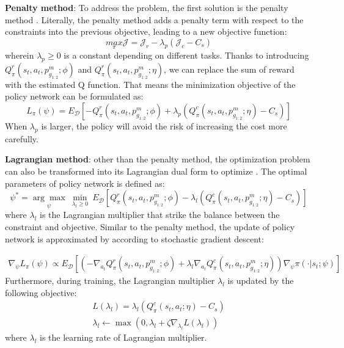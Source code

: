 \documentclass{article}
\begin{document}
\textbf{Penalty method}: To address the problem, the first solution is the penalty method \cite{geibel2005risk}. Literally, the penalty method adds a penalty term with respect to the constraints into the previous objective, leading to a new objective function:
\begin{equation}
  \label{eq11}
\underset{\pi}{max} \mathcal J =\mathcal J_r - \lambda_p (\mathcal J_c - C_s)
\end{equation}
wherein $\lambda_p \geq 0$ is a constant depending on different tasks. Thanks to introducing $Q^r_\pi(s_t,a_t,p^m_{g_{1:2}};\phi)$ and $Q^r_\pi(s_t,a_t,p^m_{g_{1:2}};\eta)$, we can replace the sum of reward with the estimated Q function. That means the minimization objective of the policy network can be formulated as:
\begin{equation}
  \label{eq12}
L_\pi(\psi) = E_{\mathcal D}[-Q^r_\pi(s_t,a_t,p^m_{g_{1:2}};\phi)+\lambda_p (Q^c_\pi(s_t,a_t,p^m_{g_{1:2}};\eta)-C_s)]
\end{equation}
When $\lambda_p$ is larger, the policy will avoid the risk of increasing the cost more carefully.

\textbf{Lagrangian method}: other than the penalty method, the optimization problem can also be transformed into its Lagrangian dual form to optimize \cite{stooke2020responsive}. The optimal parameters of policy network is defined as:
\begin{equation}
  \label{eq13}
\psi^* = \underset{\psi}{\arg \max} \ \underset{\lambda_l \geq 0}{\min} \ E_{\mathcal D} [ Q^r_\pi(s_t,a_t,p^m_{g_{1:2}};\phi)-\lambda_l (Q^c_\pi(s_t,a_t,p^m_{g_{1:2}};\eta)-C_s)]
\end{equation}
where $\lambda_l$ is the Lagrangian multiplier that strike the balance between the constraint and objective. Similar to the penalty method, the update of policy network is approximated by according to stochastic gradient descent:

\begin{equation}
  \label{eq14}
\begin{split}
\nabla_{\psi} L_\pi(\psi) \propto E_{\mathcal D}[(-\nabla_{a_t} Q^r_{\pi}(s_t, a_t,p^m_{g_{1:2}};\phi) 
+ \lambda_l \nabla_{a_t} Q^c_{\pi}(s_t, a_t,p^m_{g_{1:2}};\eta))\nabla_{\psi} \pi(\cdot|s_t;\psi) ]    
\end{split}
\end{equation}
Furthermore, during training, the Lagrangian multiplier $\lambda_l$ is updated by the following objective:
\begin{equation}
  \label{eq15}
\begin{split}
L(\lambda_l) = \lambda_l (Q^c_\pi(s_t,a_t;\eta)-C_s) \\
\lambda_l \leftarrow \max (0, \lambda_l + \zeta \nabla_{\lambda_l} L(\lambda_l) )   
\end{split}
\end{equation}
where $\lambda_l$ is the learning rate of Lagrangian multiplier. 
\end{document}
